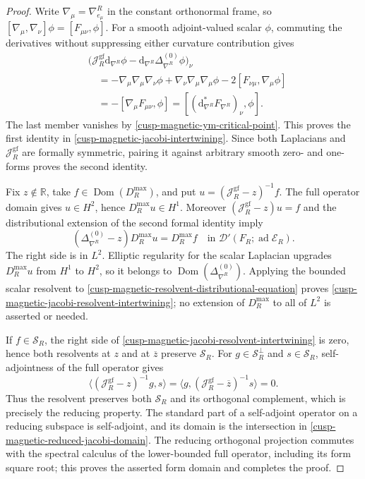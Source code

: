 \begin{proof}
Write \(\nabla_\mu=\nabla^R_{e_\mu}\) in the constant orthonormal frame,
so
\([\nabla_\mu,\nabla_\nu]\phi=[F_{\mu\nu},\phi]\).
For a smooth adjoint-valued scalar \(\phi\), commuting the derivatives
without suppressing either curvature contribution gives
\begin{align*}
 &\bigl(\mathcal J_R^{\mathrm{gf}}\mathrm d_{\nabla^R}\phi
       -\mathrm d_{\nabla^R}\Delta_{\nabla^R}^{(0)}\phi\bigr)_\nu\\
 &\quad=-\nabla_\mu\nabla_\mu\nabla_\nu\phi
         +\nabla_\nu\nabla_\mu\nabla_\mu\phi
         -2[F_{\nu\mu},\nabla_\mu\phi]\\
 &\quad=-[\nabla_\mu F_{\mu\nu},\phi]
   =[ (\mathrm d_{\nabla^R}^*F_{\nabla^R})_\nu,\phi].
\end{align*}
The last member vanishes by
\cref{cusp-magnetic-ym-critical-point}.  This proves the first identity
in \eqref{cusp-magnetic-jacobi-intertwining}.  Since both Laplacians and
\(\mathcal J_R^{\mathrm{gf}}\) are formally symmetric, pairing it against
arbitrary smooth zero- and one-forms proves the second identity.

Fix \(z\notin\mathbb R\), take
\(f\in\operatorname{Dom}(D_R^{\max})\), and put
\(u=(\mathcal J_R^{\mathrm{gf}}-z)^{-1}f\).
The full operator domain gives \(u\in H^2\), hence
\(D_R^{\max}u\in H^1\).  Moreover
\((\mathcal J_R^{\mathrm{gf}}-z)u=f\) and the distributional extension of
the second formal identity imply
\begin{equation}
 (\Delta_{\nabla^R}^{(0)}-z)D_R^{\max}u=D_R^{\max}f
 \quad\text{in }\mathcal D'(F_R;\operatorname{ad}\mathscr E_R).
 \label{cusp-magnetic-resolvent-distributional-equation}
\end{equation}
The right side is in \(L^2\).  Elliptic regularity for the scalar
Laplacian upgrades \(D_R^{\max}u\) from \(H^1\) to \(H^2\), so it belongs
to \(\operatorname{Dom}(\Delta_{\nabla^R}^{(0)})\).  Applying the bounded
scalar resolvent to
\eqref{cusp-magnetic-resolvent-distributional-equation} proves
\eqref{cusp-magnetic-jacobi-resolvent-intertwining}; no extension of
\(D_R^{\max}\) to all of \(L^2\) is asserted or needed.

If \(f\in\mathscr S_R\), the right side of
\eqref{cusp-magnetic-jacobi-resolvent-intertwining} is zero, hence both
resolvents at \(z\) and at \(\overline z\) preserve \(\mathscr S_R\).
For \(g\in\mathscr S_R^\perp\) and \(s\in\mathscr S_R\), self-adjointness
of the full operator gives
\[
 \langle(\mathcal J_R^{\mathrm{gf}}-z)^{-1}g,s\rangle
 =\langle g,(\mathcal J_R^{\mathrm{gf}}-\overline z)^{-1}s\rangle=0.
\]
Thus the resolvent preserves both \(\mathscr S_R\) and its orthogonal
complement, which is precisely the reducing property.  The standard
part of a self-adjoint operator on a reducing subspace is self-adjoint,
and its domain is the intersection in
\eqref{cusp-magnetic-reduced-jacobi-domain}.  The reducing orthogonal
projection commutes with the spectral calculus of the lower-bounded full
operator, including its form square root; this proves the asserted form
domain and completes the proof.
\end{proof}

